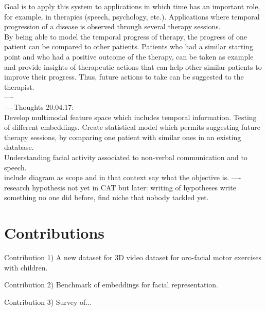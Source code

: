 Goal is to apply this system to applications in which time has an important role, for example, in therapies (speech, psychology, etc.). Applications where temporal progression of a disease is observed through several therapy sessions.\\

By being able to model the temporal progress of therapy, the progress of one patient can be compared to other patients. Patients who had a similar starting point and who had a positive outcome of the therapy, can be taken as example and provide insights of therapeutic actions that can help other similar patients to improve their progress. Thus, future actions to take can be suggested to the therapist.   
\\
----\\

----Thoughts 20.04.17:\\
Develop multimodal feature space which includes temporal information. Testing of different embeddings. Create statistical model which permits suggesting future therapy sessions, by comparing one patient with similar ones in an existing database.\\
Understanding facial activity associated to non-verbal communication and to speech.\\ include diagram as scope and in that context say what the objective is.
----\\
research hypothesis not yet in CAT but later: writing of hypotheses write something no one did before, find niche that nobody tackled yet. 

\section{Contributions}

Contribution 1) A new dataset for 3D video dataset for oro-facial motor exercises with children.

Contribution 2) Benchmark of embeddings for facial representation.

Contribution 3) Survey of...


